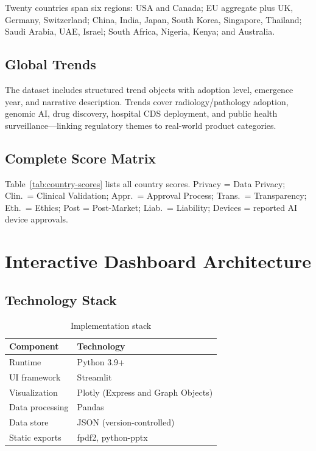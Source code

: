 \documentclass[12pt,a4paper]{report}
\begin{document}
Twenty countries span six regions: USA and Canada; EU aggregate plus UK, Germany, Switzerland; China, India, Japan, South Korea, Singapore, Thailand; Saudi Arabia, UAE, Israel; South Africa, Nigeria, Kenya; and Australia.

\section{Global Trends}

The dataset includes structured trend objects with adoption level, emergence year, and narrative description. Trends cover radiology/pathology adoption, genomic AI, drug discovery, hospital CDS deployment, and public health surveillance---linking regulatory themes to real-world product categories.

\section{Complete Score Matrix}

Table~\ref{tab:country-scores} lists all country scores. Privacy = Data Privacy; Clin.\ = Clinical Validation; Appr.\ = Approval Process; Trans.\ = Transparency; Eth.\ = Ethics; Post = Post-Market; Liab.\ = Liability; Devices = reported AI device approvals.





\chapter{Interactive Dashboard Architecture}
\label{ch:dashboard}

\section{Technology Stack}

\begin{table}[htbp]
  \centering
  \caption{Implementation stack}
  \label{tab:stack}
  \begin{tabular}{@{}ll@{}}
    \toprule
    \textbf{Component} & \textbf{Technology} \\
    \midrule
    Runtime & Python 3.9+ \\
    UI framework & Streamlit \\
    Visualization & Plotly (Express and Graph Objects) \\
    Data processing & Pandas \\
    Data store & JSON (version-controlled) \\
    Static exports & fpdf2, python-pptx \\
    \bottomrule
  \end{tabular}
\end{table}
\end{document}

